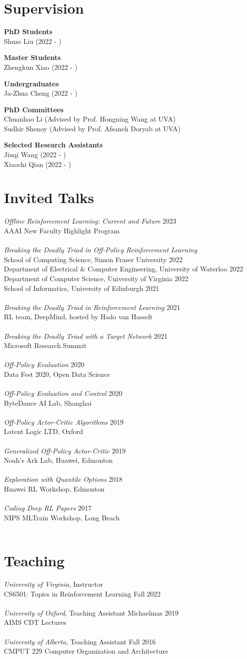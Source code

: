 \documentclass[margin, 10pt]{res} %
\newcommand*{\talk}[3]{{{\sl #2} \hfill #1 \\ #3 \\ \\}}
\newcommand*{\teaching}[4]{{{\sl #3}, #2 \hfill #1 \\ #4\\ \\}}
\begin{document}
\begin{resume}
\section{Supervision}
\textbf{PhD Students} \\
Shuze Liu (2022 - )

\textbf{Master Students} \\
Zhengkun Xiao (2022 - )

\textbf{Undergraduates} \\
Ja-Zhua Cheng (2022 - )

\textbf{PhD Committees} \\
Chuanhao Li (Advised by Prof. Hongning Wang at UVA) \\
Sudhir Shenoy (Advised by Prof. Afsaneh Doryab at UVA) 

\textbf{Selected Research Assistants} \\
Jiuqi Wang (2022 - ) \\
Xiaochi Qian (2022 - ) \\

\section{Invited Talks}
\talk{2023}{Offline Reinforcement Learning: Current and Future}{AAAI New Faculty Highlight Program}
\talk{}{Breaking the Deadly Triad in Off-Policy Reinforcement Learning}{
School of Computing Science, Simon Fraser University \hfill 2022\\
Department of Electrical \& Computer Engineering, University of Waterloo \hfill 2022 \\
Department of Computer Science, University of Virginia \hfill 2022 \\
School of Informatics, University of Edinburgh \hfill 2021}
\talk{2021}{Breaking the Deadly Triad in Reinforcement Learning}{RL team, DeepMind, hosted by Hado van Hasselt}
\talk{2021}{Breaking the Deadly Triad with a Target Network}{Microsoft Research Summit}
\talk{2020}{Off-Policy Evaluation}{Data Fest 2020, Open Data Science}
\talk{2020}{Off-Policy Evaluation and Control}{ByteDance AI Lab, Shanghai}
\talk{2019}{Off-Policy Actor-Critic Algorithms}{Latent Logic LTD, Oxford}
\talk{2019}{Generalized Off-Policy Actor-Critic}{Noah's Ark Lab, Huawei, Edmonton}
\talk{2018}{Exploration with Quantile Options}{Huawei RL Workshop, Edmonton}
\talk{2017}{Coding Deep RL Papers}{NIPS MLTrain Workshop, Long Beach}

\section{Teaching}
\teaching{}{Instructor}{University of Virginia}{CS6501: Topics in Reinforcement Learning \hfill Fall 2022}
\teaching{Michaelmas 2019}{Teaching Assistant}{University of Oxford}{AIMS CDT Lectures}
\teaching{Fall 2016}{Teaching Assistant}{University of Alberta}{CMPUT 229 Computer Organization and Architecture}


\end{resume}
\end{document}
